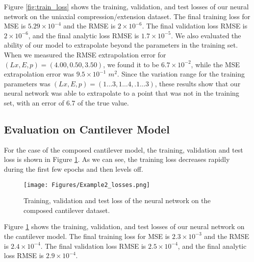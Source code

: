 \documentclass[oneside,a4paper,english,links]{amca}
\begin{document}
Figure \ref{fig:train_loss} shows the training, validation, and test losses of our neural network on the uniaxial compression/extension dataset. The final training loss for MSE is $5.29\times10^{-4}$ and the RMSE is $2\times10^{-6}$. The final validation loss RMSE is $2\times10^{-6}$, and the final analytic loss RMSE is $1.7\times10^{-5}$.
We also evaluated the ability of our model to extrapolate beyond the parameters in the training set. When we measured the RMSE extrapolation error for $(Lx, E, p) = (4.00, 0.50, 3.50)$, we found it to be $6.7\times10^{-2}$, while the MSE extrapolation error was $9.5\times10^{-1}$ $m^2$. Since the variation range for the training parameters was $(Lx, E, p) = (1 \hdots 3, 1 \hdots 4, .1 \hdots 3)$, these results show that our neural network was able to extrapolate to a point that was not in the training set, with an error of 6.7 of the true value.

\subsection{Evaluation on Cantilever Model}
For the case of the composed cantilever model, the training, validation and test loss is shown in Figure \ref{fig:composed_cantilever_loss}. As we can see, the training loss decreases rapidly during the first few epochs and then levels off. 

\begin{figure}[ht]
\centering
\texttt{[image: Figures/Example2\_losses.png]}
\caption{Training, validation and test loss of the neural network on the composed cantilever dataset.}
\label{fig:composed_cantilever_loss}
\end{figure}


Figure \ref{fig:composed_cantilever_loss} shows the training, validation, and test losses of our neural network on the cantilever model. The final training loss for MSE is $2.3\times10^{-3}$ and the RMSE is $2.4\times10^{-4}$. The final validation loss RMSE is $2.5\times10^{-4}$, and the final analytic loss RMSE is $2.9\times10^{-4}$.
\end{document}
